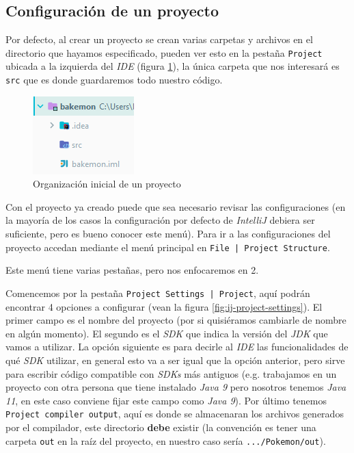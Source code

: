\subsection{Configuración de un proyecto}
  Por defecto, al crear un proyecto se crean varias carpetas y archivos en el directorio que hayamos
  especificado, pueden ver esto en la pestaña \texttt{Project} ubicada a la izquierda del 
  \textit{IDE} (figura \ref{fig:project-fs}), la única carpeta que nos interesará es \texttt{src} 
  que es donde guardaremos todo nuestro código.

  \begin{figure}[ht!]
    \centering
    \includegraphics{img/Profundizando en Java/IntellJ Project FS.png}
    \caption{Organización inicial de un proyecto}
    \label{fig:project-fs}
  \end{figure}

  Con el proyecto ya creado puede que sea necesario revisar las configuraciones (en la mayoría de 
  los casos la configuración por defecto de \textit{IntelliJ} debiera ser suficiente, pero es bueno
  conocer este menú).
  Para ir a las configuraciones del proyecto accedan mediante el menú principal en \texttt{File | 
  Project Structure}.

  Este menú tiene varias pestañas, pero nos enfocaremos en 2.

  Comencemos por la pestaña \texttt{Project Settings | Project}, aquí podrán encontrar 4 opciones a 
  configurar (vean la figura \ref{fig:ij-project-settings}).
  El primer campo es el nombre del proyecto (por si quisiéramos cambiarle de nombre en algún 
  momento). 
  El segundo es el \textit{SDK} que indica la versión del \textit{JDK} que vamos a 
  utilizar.
  La opción siguiente es para decirle al \textit{IDE} las funcionalidades de qué 
  \textit{SDK} utilizar, en general esto va a ser igual que la opción anterior, pero sirve para 
  escribir código compatible con \textit{SDKs} más antiguos (e.g. trabajamos en un proyecto con otra
  persona que tiene instalado \textit{Java 9} pero nosotros tenemos \textit{Java 11}, en este caso 
  conviene fijar este campo como \textit{Java 9}).
  Por último tenemos \texttt{Project compiler output}, aquí es donde se almacenaran los archivos 
  generados por el compilador, este directorio \textbf{debe} existir (la convención es tener una 
  carpeta \texttt{out} en la raíz del proyecto, en nuestro caso sería \texttt{.../Pokemon/out}).

